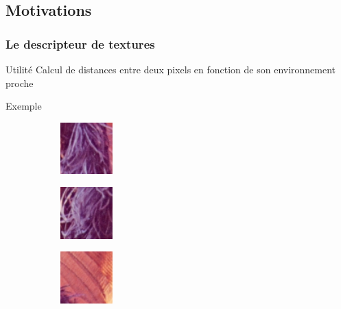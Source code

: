 \documentclass{beamer}
\begin{document}
\subsection{Motivations}
\begin{frame}
    \frametitle{Le descripteur de textures}
    \begin{block}{Utilité}
        Calcul de distances entre deux pixels en fonction de son environnement proche
    \end{block}
    \begin{exampleblock}{Exemple}
        \begin{figure}
            \centering
            \begin{subfigure}{0.3\textwidth}
                \centering
                \includegraphics[height=2cm]{img/lena_texture1}
                \caption{}
            \end{subfigure}
            \begin{subfigure}{0.3\textwidth}
                \centering
                \includegraphics[height=2cm]{img/lena_texture2}
                \caption{}
            \end{subfigure}
            \begin{subfigure}{0.3\textwidth}
                \centering
                \includegraphics[height=2cm]{img/lena_texture3}
                \caption{}
            \end{subfigure}
        \end{figure}
    \end{exampleblock}
\end{frame}
\end{document}
